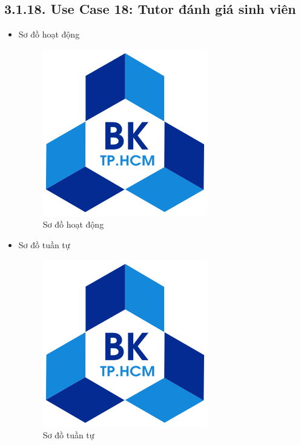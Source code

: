 \subsection*{3.1.18. Use Case 18: Tutor đánh giá sinh viên}
\begin{itemize}
    \item Sơ đồ hoạt động
    \begin{figure}[H]
    \centering
    \includegraphics[scale=0.5 ]{Picture/hcmut.png}
    \caption{Sơ đồ hoạt động }
    \end{figure}
    \item Sơ đồ tuần tự
    \begin{figure}[H]
    \centering
    \includegraphics[scale=0.5 ]{Picture/hcmut.png}
    \caption{Sơ đồ tuần tự }
    \end{figure}
\end{itemize}
